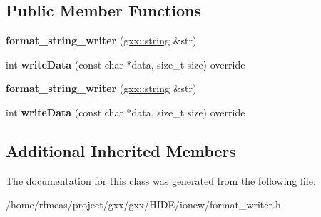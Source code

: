 \subsection*{Public Member Functions}
\begin{DoxyCompactItemize}
\item 
{\bfseries format\+\_\+string\+\_\+writer} (\hyperlink{classgxx_1_1basic__string}{gxx\+::string} \&str)\hypertarget{classgxx_1_1io_1_1format__string__writer_afbb0574f36f17bcbd516753e24c99677}{}\label{classgxx_1_1io_1_1format__string__writer_afbb0574f36f17bcbd516753e24c99677}

\item 
int {\bfseries write\+Data} (const char $\ast$data, size\+\_\+t size) override\hypertarget{classgxx_1_1io_1_1format__string__writer_abd272019808b81de6c3e006799da16c7}{}\label{classgxx_1_1io_1_1format__string__writer_abd272019808b81de6c3e006799da16c7}

\item 
{\bfseries format\+\_\+string\+\_\+writer} (\hyperlink{classgxx_1_1basic__string}{gxx\+::string} \&str)\hypertarget{classgxx_1_1io_1_1format__string__writer_afbb0574f36f17bcbd516753e24c99677}{}\label{classgxx_1_1io_1_1format__string__writer_afbb0574f36f17bcbd516753e24c99677}

\item 
int {\bfseries write\+Data} (const char $\ast$data, size\+\_\+t size) override\hypertarget{classgxx_1_1io_1_1format__string__writer_abd272019808b81de6c3e006799da16c7}{}\label{classgxx_1_1io_1_1format__string__writer_abd272019808b81de6c3e006799da16c7}

\end{DoxyCompactItemize}
\subsection*{Additional Inherited Members}


The documentation for this class was generated from the following file\+:\begin{DoxyCompactItemize}
\item 
/home/rfmeas/project/gxx/gxx/\+H\+I\+D\+E/ionew/format\+\_\+writer.\+h\end{DoxyCompactItemize}
